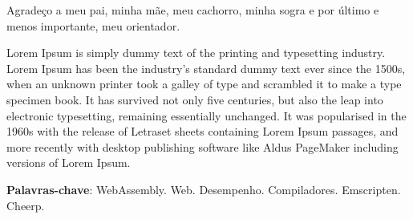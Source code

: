 
\begin{agradecimentos}

Agradeço a meu pai, minha mãe, meu cachorro, minha sogra e por último e menos importante, meu orientador.
\end{agradecimentos}



\setlength{\absparsep}{18pt} %
\begin{resumo}
	\SingleSpacing
Lorem Ipsum is simply dummy text of the printing and typesetting industry. Lorem Ipsum has been the industry's standard dummy text ever since the 1500s, when an unknown printer took a galley of type and scrambled it to make a type specimen book. It has survived not only five centuries, but also the leap into electronic typesetting, remaining essentially unchanged. It was popularised in the 1960s with the release of Letraset sheets containing Lorem Ipsum passages, and more recently with desktop publishing software like Aldus PageMaker including versions of Lorem Ipsum.


	\textbf{Palavras-chave}: WebAssembly. Web. Desempenho. Compiladores. Emscripten. Cheerp.
\end{resumo}

